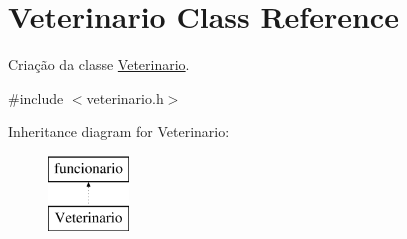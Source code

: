 \hypertarget{class_veterinario}{}\section{Veterinario Class Reference}
\label{class_veterinario}


Criação da classe \mbox{\hyperlink{class_veterinario}{Veterinario}}.  




{\ttfamily \#include $<$veterinario.\+h$>$}

Inheritance diagram for Veterinario\+:\begin{figure}[H]
\begin{center}
\leavevmode
\includegraphics[height=2.000000cm]{class_veterinario}
\end{center}
\end{figure}
